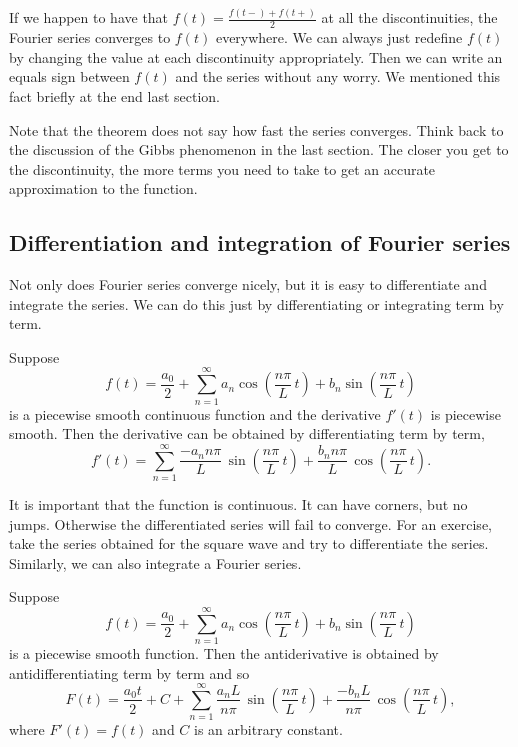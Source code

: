 \documentclass[12pt]{book}
\begin{document}
If we happen to have that
$f(t) = \frac{f(t-)+f(t+)}{2}$ at all the discontinuities, the Fourier series
converges to $f(t)$ everywhere.  We can always just redefine $f(t)$
by changing the value at each discontinuity appropriately.  Then we can write
an equals sign between $f(t)$ and the series without any worry.
We mentioned this fact
briefly at the end last section.

Note that the theorem does not say how fast the series converges.
Think back to the discussion of the Gibbs phenomenon in the last section.
The closer you get to the discontinuity, the more terms you need to take
to get an accurate approximation to the function.

\subsection{Differentiation and integration of Fourier series}

Not only does Fourier series converge nicely, but it is easy to differentiate
and integrate the series.  We can do this just by differentiating or
integrating term by term.

\begin{theorem}
Suppose
\begin{equation*}
f(t) = \frac{a_0}{2} + \sum_{n=1}^\infty a_n \cos \left( \frac{n \pi}{L} \, t
\right)
+ b_n \sin \left( \frac{n \pi}{L} \, t \right)
\end{equation*}
is a piecewise smooth continuous function and the derivative $f'(t)$ is
piecewise smooth.  Then the derivative can be
obtained by differentiating term by term,
\begin{equation*}
f'(t) = \sum_{n=1}^\infty \frac{-a_n n \pi}{L} \,
\sin \left( \frac{n \pi}{L} \, t \right)
+ \frac{b_n n \pi}{L} \, \cos \left( \frac{n \pi}{L} \, t \right) .
\end{equation*}
\end{theorem}

It is important that the function is continuous.  It can have corners, but no
jumps.  Otherwise the differentiated series will fail to converge.  For an
exercise, take the series obtained for the square wave and try to
differentiate the series.  Similarly, we can also integrate a Fourier series.

\begin{theorem}
Suppose
\begin{equation*}
f(t) = \frac{a_0}{2} + \sum_{n=1}^\infty
a_n \cos \left( \frac{n \pi}{L} \, t \right)
+ b_n \sin \left( \frac{n \pi}{L} \, t \right)
\end{equation*}
is a piecewise smooth function.  Then the antiderivative is
obtained by antidifferentiating term by term and so
\begin{equation*}
F(t) = \frac{a_0 t}{2} + C + \sum_{n=1}^\infty
\frac{a_n L}{n \pi} \, \sin \left( \frac{n \pi}{L} \, t \right)
+ \frac{-b_n L}{n \pi} \, \cos \left( \frac{n \pi}{L} \, t \right) ,
\end{equation*}
where $F'(t) = f(t)$ and $C$ is an arbitrary constant.
\end{theorem}
\end{document}
